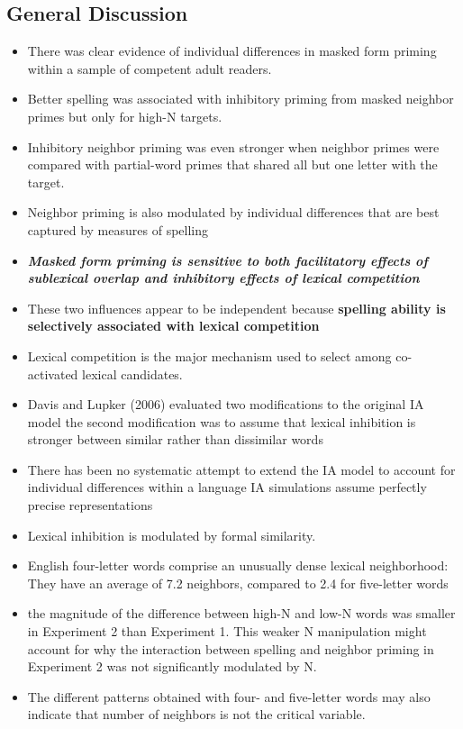 \documentclass[]{article}
\begin{document}
		\subsection{General Discussion}
		\begin{itemize}
			\item There was clear evidence of individual differences in masked form priming within a sample of competent adult readers.
			\item Better spelling was associated with inhibitory priming from masked neighbor primes but only for high-N targets.
			\item Inhibitory neighbor priming was even stronger when neighbor primes were compared with partial-word primes that shared all but one letter with the target.
			\item Neighbor priming is also modulated by individual differences that are best captured by measures of spelling
			\item \textit{\textbf{Masked form priming is sensitive to both facilitatory effects of sublexical overlap and inhibitory effects of lexical competition}}
			\item These two influences appear to be independent because \textbf{spelling ability is selectively associated with lexical competition}
			\item Lexical competition is the major mechanism used to select among co-activated lexical candidates.
			\item Davis and Lupker (2006) evaluated two modifications to the original IA model \textemdash the second modification was to assume that lexical inhibition is stronger between similar rather than dissimilar words
			\item There has been no systematic attempt to extend the IA model to account for individual differences within a language \textemdash  IA simulations assume perfectly precise representations
			\item Lexical inhibition is modulated by formal similarity.
			\item  English four-letter words comprise an unusually dense lexical neighborhood: They have an average of 7.2 neighbors, compared to 2.4 for five-letter words 
			\item the magnitude of the difference between high-N and low-N words was smaller in Experiment 2 than Experiment 1. This weaker N manipulation might account for why the interaction between spelling and neighbor priming in Experiment 2 was not significantly modulated by N.
			\item The different patterns obtained with four- and five-letter words may also indicate that number of neighbors is not the critical variable. 

\end{itemize}
\end{document}
